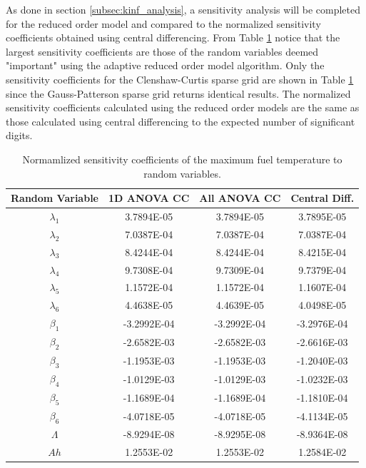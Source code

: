 As done in section \ref{subsec:kinf_analysis}, a sensitivity analysis will be completed for the reduced order model and compared to the normalized sensitivity coefficients obtained using central differencing. From Table \ref{table:pk_sensitivities} notice that the largest sensitivity coefficients are those of the random variables deemed "important" using the adaptive reduced order model algorithm. Only the sensitivity coefficients for the Clenshaw-Curtis sparse grid are shown in Table \ref{table:pk_sensitivities} since the Gauss-Patterson sparse grid returns identical results. The normalized sensitivity coefficients calculated using the reduced order models are the same as those calculated using central differencing to the expected number of significant digits.   
\begin{table} 
\caption{\label{table:pk_sensitivities} 
Normamlized sensitivity coefficients of the maximum fuel temperature to random variables.}
\centering
\begin{tabular}{||c|c|c|c||} 
\hline \hline
\textbf{Random Variable} & \textbf{1D ANOVA CC} & \textbf{All ANOVA CC} & \textbf{Central Diff.} \\ \hline
$\lambda_1$  &  3.7894E-05 &  3.7894E-05 &  3.7895E-05 \\ \hline
$\lambda_2$  &  7.0387E-04 &  7.0387E-04 &  7.0387E-04 \\ \hline
$\lambda_3$  &  8.4244E-04 &  8.4244E-04 &  8.4215E-04 \\ \hline
$\lambda_4$  &  9.7308E-04 &  9.7309E-04 &  9.7379E-04 \\ \hline
$\lambda_5$  &  1.1572E-04 &  1.1572E-04 &  1.1607E-04 \\ \hline
$\lambda_6$  &  4.4638E-05 &  4.4639E-05 &  4.0498E-05 \\ \hline
$\beta_1$    & -3.2992E-04 & -3.2992E-04 & -3.2976E-04 \\ \hline
$\beta_2$    & -2.6582E-03 & -2.6582E-03 & -2.6616E-03 \\ \hline
$\beta_3$    & -1.1953E-03 & -1.1953E-03 & -1.2040E-03 \\ \hline
$\beta_4$    & -1.0129E-03 & -1.0129E-03 & -1.0232E-03 \\ \hline
$\beta_5$    & -1.1689E-04 & -1.1689E-04 & -1.1810E-04 \\ \hline
$\beta_6$    & -4.0718E-05 & -4.0718E-05 & -4.1134E-05 \\ \hline
$\Lambda$    & -8.9294E-08 & -8.9295E-08 & -8.9364E-08 \\ \hline
$Ah$         &  1.2553E-02 &  1.2553E-02 &  1.2584E-02 \\ \hline

\end{tabular}
\end{table}
